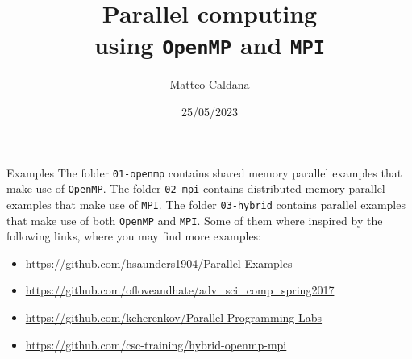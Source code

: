 \documentclass[10pt,aspectratio=169]{beamer}
\begin{document}
    \title{Parallel computing\protect\\using \texttt{OpenMP} and \texttt{MPI}}
    \author{Matteo Caldana}
    \date{25/05/2023}

\begin{frame}
    \maketitle
\end{frame}

\begin{frame}{Examples}
The folder \texttt{01-openmp} contains shared memory parallel examples that make use of \texttt{OpenMP}.
\vfill
The folder \texttt{02-mpi} contains distributed memory parallel examples that make use of \texttt{MPI}.
\vfill
The folder \texttt{03-hybrid} contains parallel examples that make use of both \texttt{OpenMP} and \texttt{MPI}.
\vfill
Some of them where inspired by the following links, where you may find more examples:
\begin{itemize}
    \item \url{https://github.com/hsaunders1904/Parallel-Examples}
    \item \url{https://github.com/ofloveandhate/adv_sci_comp_spring2017}
    \item \url{https://github.com/kcherenkov/Parallel-Programming-Labs}
    \item \url{https://github.com/csc-training/hybrid-openmp-mpi}
\end{itemize}
\end{frame}
\end{document}
